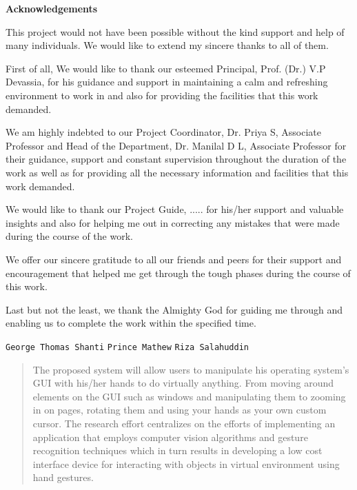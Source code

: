 \documentclass[11pt]{report}
\begin{document}
\begin{titlepage}
\vspace{.25in}	
\begin{center}
\textbf{Acknowledgements}\\
\end{center}
\normalsize

This project would not have been possible without the kind support and help of many individuals. We would like to extend my sincere thanks to all of them.
  
First of all, We would like to thank our esteemed Principal, Prof. (Dr.) V.P Devassia, for his guidance and support in maintaining a calm and refreshing environment to work in and also for providing the facilities that this work demanded.
  
We am highly indebted to our Project Coordinator, Dr. Priya S, Associate Professor and Head of the Department, Dr. Manilal D L, Associate Professor for their guidance, support and constant supervision throughout the duration of the work as well as for providing all the necessary information and facilities that this work demanded.

We would like to thank our Project Guide, ..... for his/her support and valuable insights and also for helping me out in correcting any mistakes that were made during the course of the work. 
  
We offer our sincere gratitude to all our friends and peers for their support and encouragement that helped me get through the tough phases during the course of this work.
  
Last but not the least, we thank the Almighty God for guiding me through and enabling us to complete the work within the specified time.
\vspace{.25in}

\vspace{.25in}


\flushleft \small{\texttt{George Thomas Shanti}}
\flushleft \small{\texttt{Prince Mathew}}
\flushleft \small{\texttt{Riza Salahuddin}}
 
\end{titlepage}



\begin{abstract}

The proposed system will allow users to manipulate his operating system’s GUI with his/her hands to do virtually anything. From moving around elements on the GUI such as windows and manipulating them to zooming in on pages, rotating them and using your hands as your own custom cursor. The research effort centralizes on the efforts of implementing an application that employs computer vision algorithms and gesture recognition techniques which in turn results in developing a low cost interface device for interacting with objects in virtual environment using hand gestures.
\end{abstract}
\end{document}
